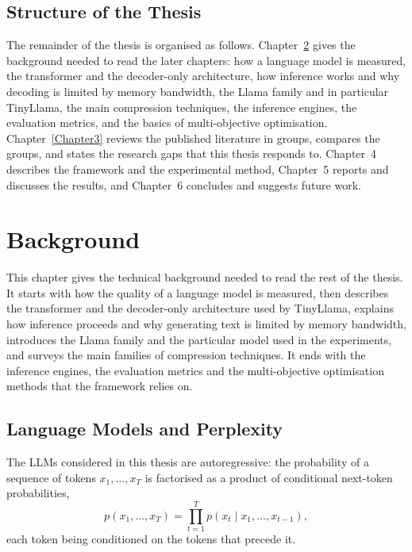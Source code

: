 \documentclass[
11pt, %
english, %
singlespacing, %
headsepline, %
]{MastersDoctoralThesis} %
\begin{document}
\section{Structure of the Thesis}
\label{sec:ch1-structure}

The remainder of the thesis is organised as follows. Chapter~\ref{Chapter2} gives the background needed to read the later chapters: how a language model is measured, the transformer and the decoder-only architecture, how inference works and why decoding is limited by memory bandwidth, the Llama family and in particular TinyLlama, the main compression techniques, the inference engines, the evaluation metrics, and the basics of multi-objective optimisation. Chapter~\ref{Chapter3} reviews the published literature in groups, compares the groups, and states the research gaps that this thesis responds to. Chapter~4 describes the framework and the experimental method, Chapter~5 reports and discusses the results, and Chapter~6 concludes and suggests future work.
\clearpage
\clearpage
\chapter{Background}
\label{Chapter2}

This chapter gives the technical background needed to read the rest of the thesis. It starts with how the quality of a language model is measured, then describes the transformer and the decoder-only architecture used by TinyLlama, explains how inference proceeds and why generating text is limited by memory bandwidth, introduces the Llama family and the particular model used in the experiments, and surveys the main families of compression techniques. It ends with the inference engines, the evaluation metrics and the multi-objective optimisation methods that the framework relies on.

\section{Language Models and Perplexity}
\label{sec:ch2-lm}

The LLMs considered in this thesis are autoregressive: the probability of a sequence of tokens $x_1, \dots, x_T$ is factorised as a product of conditional next-token probabilities,
\begin{equation}
  p(x_1, \dots, x_T) = \prod_{t=1}^{T} p(x_t \mid x_1, \dots, x_{t-1}),
  \label{eq:ch2-ar}
\end{equation}
each token being conditioned on the tokens that precede it.
\end{document}
